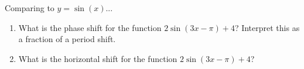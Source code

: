 \begin{myPractice}
	Comparing to $y=\sin(x)$...
	\begin{enumerate}
		\item What is the phase shift for the function $2\sin\left(3x-\pi\right)+4$? Interpret this as a fraction of a period shift.
		\vspace{1cm}
		\item What is the horizontal shift for the function $2\sin\left(3x-\pi\right)+4$?
		\vspace{1cm}
	\end{enumerate}
\end{myPractice}

